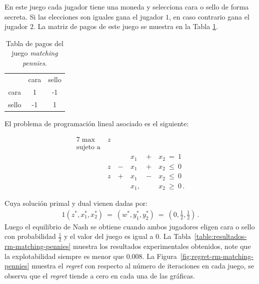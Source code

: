 En este juego cada jugador tiene una moneda y selecciona cara o sello de forma secreta. Si las elecciones son iguales gana el jugador $1$, en caso contrario gana el jugador $2$. La matriz de pagos de este juego se muestra en la Tabla \ref{table:pagos-matching-pennies}.

\begin{table}[h]
\begin{center}
\caption[Tabla de pagos del juego matching pennies]{Tabla de pagos del juego \textit{matching pennies}.}
\label{table:pagos-matching-pennies}
\begin{tabular}{ c | c | c |}
 \multicolumn{1}{c}{} & \multicolumn{1}{c}{cara} & \multicolumn{1}{c}{sello}  \\ \cline{2-3}
 cara  &  1 & -1 \\ \cline{2-3}
 sello & -1 &  1 \\ \cline{2-3}
\end{tabular}
\end{center}
\end{table}
El problema de programación lineal asociado es el siguiente:
\begin{samepage}
\begin{alignat}{7}
\max\ & z & & & &\\ \nonumber
\text{sujeto a}\ & & & & &\\ \nonumber
    &    &    & x_1\ & +\ & x_2\  =\    1 \\ \nonumber
    & z\ & -\ & x_1\ & +\ & x_2\  \leq\ 0 \\ \nonumber
    & z\ & +\ & x_1\ & -\ & x_2\  \leq\ 0 \\ \nonumber
    &    &    & x_1, &    & x_2\ \geq\ 0 \,. \nonumber
\end{alignat}
\end{samepage}
Cuya solución primal y dual vienen dadas por:
\begin{alignat}{1}
(z^*, x_1^*, x_2^*)\ =\ (w^*, y^*_1, y^*_2)\ =\ \left(0, \frac{1}{2}, \frac{1}{2} \right) \,.
\end{alignat}
Luego el equilibrio de Nash se obtiene cuando ambos jugadores eligen cara o sello con probabilidad $\frac{1}{2}$ y el valor del juego es igual a $0$. La Tabla~\ref{table:resultados-rm-matching-pennies} muestra los resultados experimentales obtenidos, note que la explotabilidad siempre es menor que $0.008$. La Figura~\ref{fig:regret-rm-matching-pennies} muestra el \textit{regret} con respecto al número de iteraciones en cada juego, se observa que el \textit{regret} tiende a cero en cada una de las gráficas.
 
